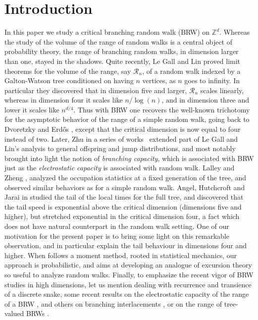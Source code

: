 \documentclass[11pt]{article}
\numberwithin{equation}{section}
\theoremstyle{plain}
\theoremstyle{definition}
\newcommand\Z{\mathbb{Z}}
\newcommand{\1}{{\text{\Large $\mathfrak 1$}}}
\begin{document}
\section{Introduction}\label{sec-intro}
In this paper we study a critical branching random walk (BRW) on $\Z^d$.
Whereas the study of the volume of the range of random walks is a central
object of probability theory, the range of branching random walks,
in dimension larger than one, stayed in the shadows.
Quite recently, Le Gall and Lin \cite{LGL1,LGL2} proved limit theorems
for the volume of the range, say $\mathcal R_n$, of a random walk indexed by a Galton-Watson tree
conditioned on having $n$ vertices, as $n$ goes
to infinity.
In particular they discovered that in dimension five and larger,
$\mathcal R_n$
scales linearly, whereas in dimension four it scales like
$n/\log(n)$, and in dimension three and lower it scales
like $n^{d/4}$. Thus with BRW one recovers the well-known trichotomy for the asymptotic behavior of the range
of a simple random walk, going back to Dvoretzky and Erd\H{o}s \cite{DE}, except that
the critical dimension is now equal to four instead of two.
Later, Zhu in a series of works~\cite{Zhu1,Zhu2,Zhu4,Zhu3} extended part of Le Gall and Lin's analysis to general offspring and jump distributions,
and most notably brought into light
the notion of {\it branching capacity}, which is associated with
BRW just as the {\it electrostatic capacity}
is associated with random walk.
Lalley and Zheng \cite{LZ11},
analyzed the occupation statistics at a fixed generation of the tree,
and observed similar behaviors as for a simple random walk.
Angel, Hutchcroft and Jarai in \cite{AHJ}
studied the tail of the local times for the full tree, and
discovered that the tail speed is
exponential above the critical dimension (dimensions five and higher), but
stretched exponential in the critical dimension four, a fact which does not have natural counterpart in the random walk setting.
One of our motivation for the present paper
is to bring some light on this remarkable observation, and in particular
explain the tail behaviour in dimensions four and higher.
When \cite{AHJ} follows a moment method, rooted in statistical mechanics,
our approach is probabilistic, and aims at developing an analogue of
excursion theory so useful to analyze random walks. Finally, to
emphasize the recent vigor of BRW studies in high dimensions,
let us mention \cite{BC12,LSS24} dealing with recurrence and transience of a discrete snake, some recent results
on the electrostatic capacity of the range of a BRW \cite{BW20,BH21,BH22},
and others on branching interlacements \cite{PZ19,Zhu18}, or on the range of tree-valued BRWs \cite{DKLT}.
\end{document}
